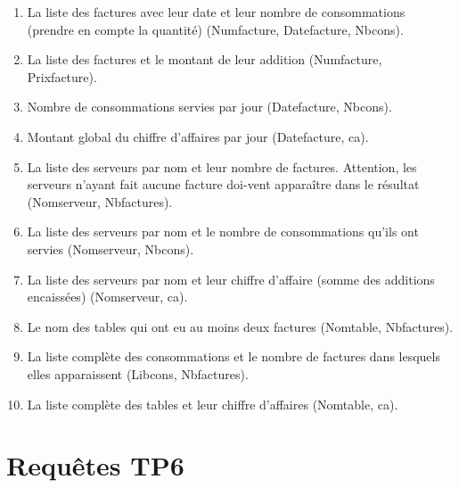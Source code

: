 \documentclass{report}
\begin{document}
\begin{enumerate}
	\item La liste des factures avec leur date et leur nombre de consommations (prendre en compte la quantité) (Numfacture, Datefacture, Nbcons).
	\item La liste des factures et le montant de leur addition (Numfacture, Prixfacture).
	\item Nombre de consommations servies par jour (Datefacture, Nbcons).
	\item Montant global du chiffre d'affaires par jour (Datefacture, ca).
	\item La liste des serveurs par nom et leur nombre de factures. Attention, les serveurs n'ayant fait aucune facture doi-vent apparaître dans le résultat (Nomserveur, Nbfactures).
	\item La liste des serveurs par nom et le nombre de consommations qu'ils ont servies (Nomserveur, Nbcons).
	\item La liste des serveurs par nom et leur chiffre d'affaire (somme des additions encaissées) (Nomserveur, ca).
	\item Le nom des tables qui ont eu au moins deux factures (Nomtable, Nbfactures).
	\item La liste complète des consommations et le nombre de factures dans lesquels elles apparaissent (Libcons, Nbfactures).
	\item La liste complète des tables et leur chiffre d'affaires (Nomtable, ca).
\end{enumerate}

\chapter{Requêtes TP6}
\label{AnnexeB}
\end{document}
